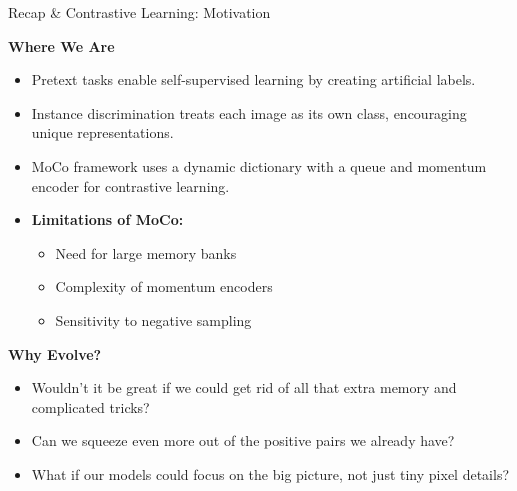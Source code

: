 \begin{frame}[allowframebreaks]{}
    \begin{figure}
        \centering
    \end{figure}
\end{frame}


\begin{frame}[allowframebreaks]{Recap \& Contrastive Learning: Motivation}

\textbf{Where We Are}
\begin{itemize}
    \item Pretext tasks enable self-supervised learning by creating artificial labels.
    \item Instance discrimination treats each image as its own class, encouraging unique representations.
    \item MoCo framework uses a dynamic dictionary with a queue and momentum encoder for contrastive learning.
    \item \textbf{Limitations of MoCo:}
    \begin{itemize}
        \item Need for large memory banks
        \item Complexity of momentum encoders
        \item Sensitivity to negative sampling
    \end{itemize}
    \end{itemize}

\framebreak

\textbf{Why Evolve?}
\begin{itemize}
    \item Wouldn't it be great if we could get rid of all that extra memory and complicated tricks?
    \item Can we squeeze even more out of the positive pairs we already have?
    \item What if our models could focus on the big picture, not just tiny pixel details?
\end{itemize}


\end{frame}